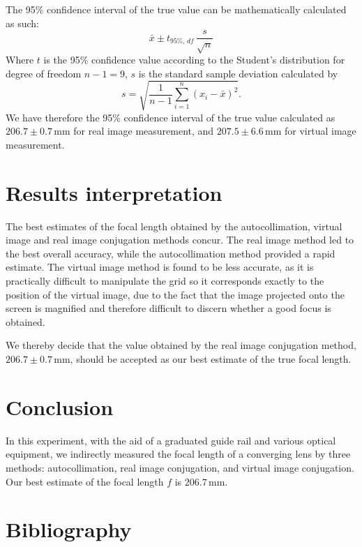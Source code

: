 \documentclass[a4paper,11pt]{article}
\begin{document}
The 95\% confidence interval of the true value can be mathematically calculated as such:
\[
  \bar{x} \pm t_{95\%,\,df}\,\frac{s}{\sqrt{n}}
\]
Where $t$ is the 95\% confidence value according to the Student's distribution for degree of freedom $n-1=9$, $s$ is the standard sample deviation calculated by
\[
  s = \sqrt{\frac{1}{n-1}\sum_{i=1}^{n}(x_i-\bar{x})^2}.
\]
We have therefore the 95\% confidence interval of the true value calculated as $206.7 \pm 0.7$\,mm for real image measurement, and $207.5 \pm 6.6$\,mm for virtual image measurement.

\section{Results interpretation}

The best estimates of the focal length obtained by the autocollimation, virtual image and real image conjugation methods concur. The real image method led to the best overall accuracy, while the autocollimation method provided a rapid estimate. The virtual image method is found to be less accurate, as it is practically difficult to manipulate the grid so it corresponds exactly to the position of the virtual image, due to the fact that the image projected onto the screen is magnified and therefore difficult to discern whether a good focus is obtained.

We thereby decide that the value obtained by the real image conjugation method, $206.7 \pm 0.7$\,mm, should be accepted as our best estimate of the true focal length.

\section{Conclusion}

In this experiment, with the aid of a graduated guide rail and various optical equipment, we indirectly measured the focal length of a converging lens by three methods: autocollimation, real image conjugation, and virtual image conjugation. Our best estimate of the focal length $f$ is $206.7$\,mm.

\section*{Bibliography}
\end{document}

